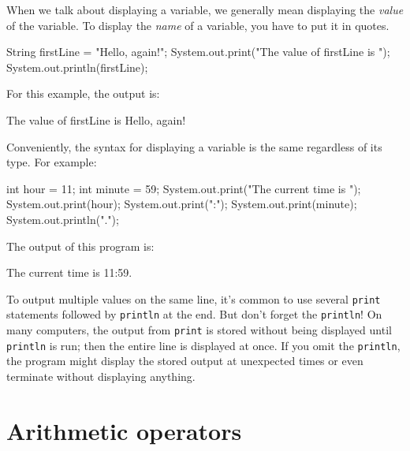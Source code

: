 \documentclass[12pt]{book}
\theoremstyle{exercise}
\newcommand{\java}[1]{\verb"#1"}
\begin{document}
%

When we talk about displaying a variable, we generally mean displaying the {\em value} of the variable.
To display the {\em name} of a variable, you have to put it in quotes.

\begin{code}
    String firstLine = "Hello, again!";
    System.out.print("The value of firstLine is ");
    System.out.println(firstLine);
\end{code}

For this example, the output is:

\begin{stdout}
The value of firstLine is Hello, again!
\end{stdout}

Conveniently, the syntax for displaying a variable is the same regardless of its type.
For example:

\begin{code}
    int hour = 11;
    int minute = 59;
    System.out.print("The current time is ");
    System.out.print(hour);
    System.out.print(":");
    System.out.print(minute);
    System.out.println(".");
\end{code}

The output of this program is:

\begin{stdout}
The current time is 11:59.
\end{stdout}

To output multiple values on the same line, it's common to use several \java{print} statements followed by \java{println} at the end.
But don't forget the \java{println}!
On many computers, the output from \java{print} is stored without being displayed until \java{println} is run; then the entire line is displayed at once.
If you omit the \java{println}, the program might display the stored output at unexpected times or even terminate without displaying anything.


\section{Arithmetic operators}
\label{sec:arithops}

\end{document}
